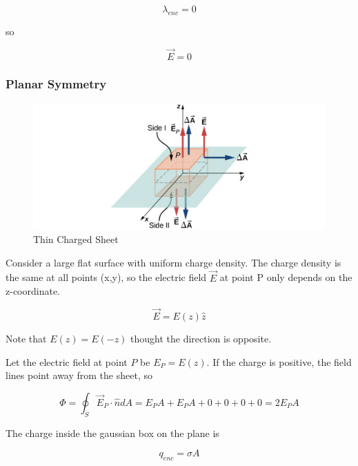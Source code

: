 \documentclass[14pt]{memoir}
\begin{document}
\begin{equation}
\lambda_{enc} = 0
\end{equation}

so

\begin{equation}
\vec{E} = 0
\end{equation}

\subsubsection{Planar Symmetry}

\begin{figure}[H]
\begin{center}
\includegraphics[scale=0.40]{fig/fig_06_33.jpg}
\caption{Thin Charged Sheet}
\label{fig:06_33}
\end{center}
\end{figure}

Consider a large flat surface with uniform charge density. The charge density is the same at all points (x,y), so the electric field $\vec{E}$ at point P only depends on the z-coordinate. 

\begin{equation}
\vec{E} = E(z) \hat{z}
\end{equation}

Note that $E(z) = E(-z)$ thought the direction is opposite. 

Let the electric field at point $P$ be $E_P = E(z)$. If the charge is positive, the field lines point away from the sheet, so

\begin{equation}
\Phi = \oint_S \vec{E}_P \cdot \hat{n} dA = E_P A + E_P A + 0 + 0 +0 + 0 = 2 E_P A
\end{equation}

The charge inside the gaussian box on the plane is 

\begin{equation}
q_{enc} = \sigma A
\end{equation}
\end{document}
